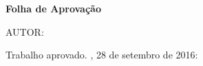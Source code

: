 %
% 
%
\begin{folhadeaprovacao}
	\begin{center}
		\textbf{Folha de Aprovação}
		\vfill

		AUTOR: \MakeUppercase{\imprimirautor}

		\vfill
		\imprimirtitulo
		\vfill

		\hspace{.45\textwidth}
		\begin{minipage}{.5\textwidth}
			\imprimirpreambulo
		\end{minipage}%
		\vfill

		Trabalho aprovado. \imprimirlocal, 28 de setembro de 2016:
	\end{center}


\end{folhadeaprovacao}